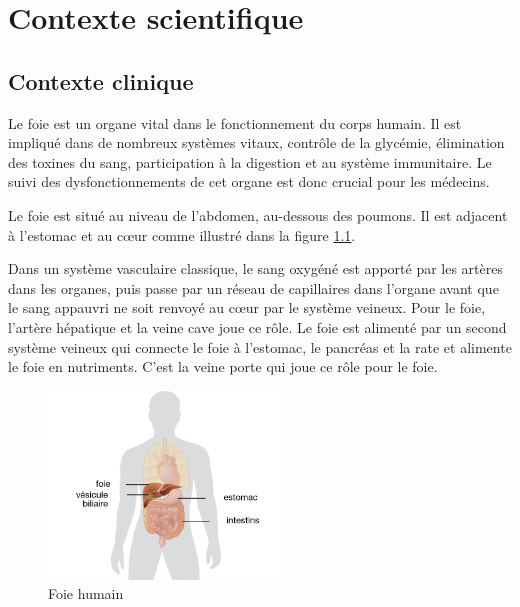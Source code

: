 %

\chapter{Contexte scientifique}
\label{sec:contexte}


\section{Contexte clinique}
\label{sec:contexte:clinique}

Le foie est un organe vital dans le fonctionnement du corps humain. Il est impliqué dans de nombreux systèmes vitaux, contrôle de la glycémie, élimination des toxines du sang, participation à la digestion et au système immunitaire. Le suivi des dysfonctionnements de cet organe est donc crucial pour les médecins.

Le foie est situé au niveau de l'abdomen, au-dessous des poumons. Il est adjacent à l'estomac et au cœur comme illustré dans la figure \ref{fig:liver}.

Dans un système vasculaire classique, le sang oxygéné est apporté par les artères dans les organes, puis passe par un réseau de capillaires dans l'organe avant que le sang appauvri ne soit renvoyé au cœur par le système veineux. Pour le foie, l'artère hépatique et la veine cave joue ce rôle. Le foie est alimenté par un second système veineux qui connecte le foie à l'estomac, le pancréas et la rate et alimente le foie en nutriments. C'est la veine porte qui joue ce rôle pour le foie.

\begin{figure}
    \centering
    \includegraphics[height=5cm]{Images/Liver.png}
    \caption{Foie humain}
    \label{fig:liver}
\end{figure}

